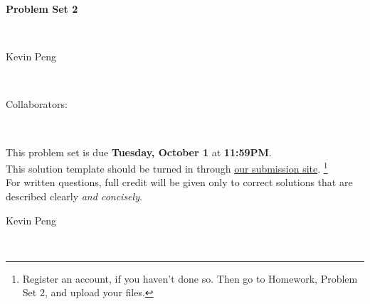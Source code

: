 \documentclass[12pt,twoside]{article}
\newcommand{\theproblemsetnum}{2}
\newcommand{\yourname}{Kevin Peng}
\newcommand{\yourcollaborators}{}
\begin{document}
\begin{center}
\begin{Large} {\bf Problem Set \theproblemsetnum} \end{Large} \vspace{12 pt} \\
\begin{large} \yourname \end{large} \\
\begin{large} Collaborators:  \yourcollaborators \end{large} \\
\end{center}

\hrulefill
\medskip

This problem set is due {\bf Tuesday, October 1} at {\bf 11:59PM}. \\

This solution template should be turned in through \color{blue} \href{https://alg.csail.mit.edu}{our submission site}. \color{black}   \footnote{Register an account, if you haven't done so.  Then go to Homework, Problem Set 2, and upload your files.  } \\

For written questions, full credit will be given only to
correct solutions that are described clearly {\em and concisely}. \\

\medskip

\hrulefill

\newpage
\begin{large} \yourname \end{large} \\
\end{document}
